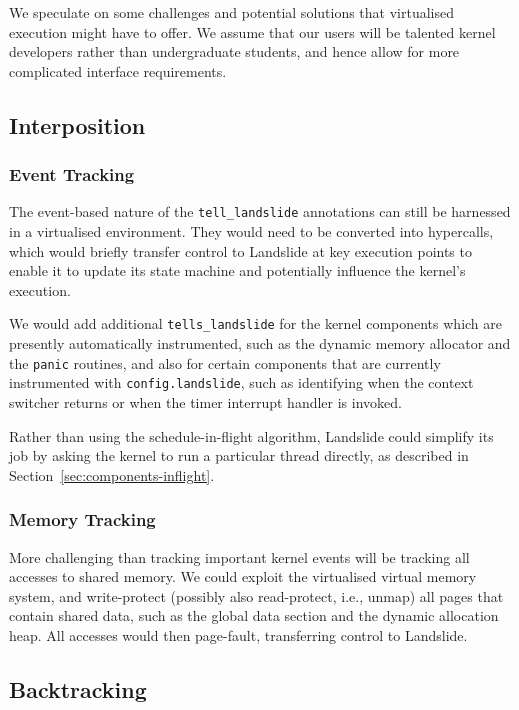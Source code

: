 We speculate on some challenges and potential solutions that virtualised execution might have to offer. We assume that our users will be talented kernel developers rather than undergraduate students, and hence allow for more complicated interface requirements.

\subsection{Interposition}

\subsubsection{Event Tracking}

The event-based nature of the \texttt{tell\_landslide} annotations can still be harnessed in a virtualised environment. They would need to be converted into hypercalls, which would briefly transfer control to Landslide at key execution points to enable it to update its state machine and potentially influence the kernel's execution.

We would add additional \texttt{tells\_landslide} for the kernel components which are presently automatically instrumented, such as the dynamic memory allocator and the \texttt{panic} routines, and also for certain components that are currently instrumented with \texttt{config.landslide}, such as identifying when the context switcher returns or when the timer interrupt handler is invoked.

Rather than using the schedule-in-flight algorithm, Landslide could simplify its job by asking the kernel to run a particular thread directly, as described in Section~\ref{sec:components-inflight}.

\subsubsection{Memory Tracking}

More challenging than tracking important kernel events will be tracking all accesses to shared memory. We could exploit the virtualised virtual memory system, and write-protect (possibly also read-protect, i.e., unmap) all pages that contain shared data, such as the global data section and the dynamic allocation heap. All accesses would then page-fault, transferring control to Landslide.

\subsection{Backtracking}

